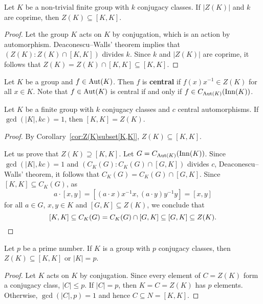 \begin{corollary}
  \label{cor:Z(K)subset[K,K]}
  Let $K$ be a non-trivial finite group with $k$ conjugacy classes. If 
  $|Z(K)|$ and $k$ are coprime, then  
  $Z(K)\subseteq[K,K]$.
\end{corollary}

\begin{proof}
	Let the group $K$ acts on $K$ by conjugation, which is an action by automorphism. 
	Deaconescu--Walls' theorem implies that 
	$(Z(K):Z(K)\cap [K,K])$ divides $k$. Since $k$ and $|Z(K)|$ are coprime, it follows that 
	$Z(K)=Z(K)\cap [K,K]\subseteq [K,K]$. 
\end{proof}

Let $K$ be a group and $f\in\operatorname{Aut}(K)$. Then $f$ is \textbf{central} if
$f(x)x^{-1}\in Z(K)$ for all $x\in K$. Note that $f\in\operatorname{Aut}(K)$ is central
if and only if $f\in C_{\operatorname{Aut}(K)}(\mathrm{Inn}(K))$.

\begin{corollary}
	Let $K$ be a finite group with $k$ conjugacy classes and $c$ central automorphisms. 
	If $\gcd(|K|,kc)=1$, then $[K,K]=Z(K)$.
\end{corollary}

\begin{proof}
	By Corollary~\ref{cor:Z(K)subset[K,K]}, $Z(K)\subseteq [K,K]$. 
	
	Let us prove
	that $Z(K)\supseteq [K,K]$. Let 
	$G=C_{\operatorname{Aut}(K)}(\mathrm{Inn}(K))$. Since $\gcd(|K|, kc)=1$ and 
	$(C_K(G):C_K(G)\cap [G,K])$ divides $c$, 
	Deaconescu--Walls' theorem, it follows that $C_K(G)=C_K(G)\cap [G,K]$. 
	Since $[K,K]\subseteq C_K(G)$, as 
	\[
		a\cdot [x,y]=[(a\cdot x)x^{-1}x,(a\cdot y)y^{-1}y]=[x,y]
	\]
	for all $a\in G$, $x,y\in K$ and $[G,K]\subseteq Z(K)$, we conclude that 
	\[
	[K,K]\subseteq C_K(G)=C_K(G)\cap [G,K]\subseteq [G,K]\subseteq Z(K).\qedhere 
	\]
\end{proof}

\begin{corollary}
  Let $p$ be a prime number. If $K$ is a group with $p$ conjugacy classes, then 
  $Z(K)\subseteq[K,K]$ or $|K|=p$. 
\end{corollary}

\begin{proof}
  Let $K$ acts on $K$ by conjugation. Since every element of $C=Z(K)$
  form a conjugacy class, $|C|\leq p$. If $|C|=p$, then $K=C=Z(K)$
  has $p$ elements. Otherwise, $\gcd(|C|,p)=1$ and hence $C\subseteq
  N=[K,K]$.
\end{proof}



